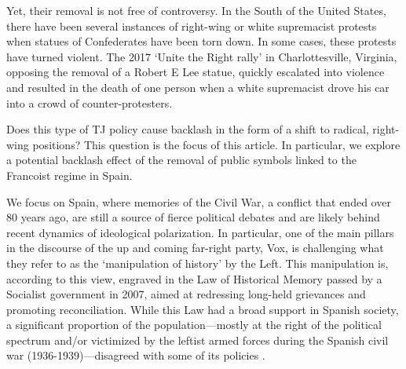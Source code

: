 \documentclass[12pt, notitlepage]{article}
\begin{document}
Yet, their removal is not free of controversy.
In the South of the United States, there have been several instances of right-wing or white supremacist protests when statues of Confederates have been torn down.
In some cases, these protests have turned violent.
The 2017 `Unite the Right rally' in Charlottesville, Virginia, opposing the removal of a Robert E Lee statue, quickly escalated into violence and resulted in the death of one person when a white supremacist drove his car into a crowd of counter-protesters.

Does this type of TJ policy cause backlash in the form of a shift to radical, right-wing positions?
This question is the focus of this article.
In particular, we explore a potential backlash effect of the removal of public symbols linked to the Francoist regime in Spain.



We focus on Spain, where memories of the Civil War, a conflict that ended over 80 years ago, are still a source of fierce political debates and are likely behind recent dynamics of ideological polarization.
In particular, one of the main pillars in the discourse of the up and coming far-right party, Vox, is challenging what they refer to as the `manipulation of history' by the Left.
This manipulation is, according to this view, engraved in the Law of Historical Memory passed by a Socialist government in 2007, aimed at redressing long-held grievances and promoting reconciliation.
While this Law had a broad support in Spanish society, a significant proportion of the population---mostly at the right of the political spectrum and/or victimized by the leftist armed forces during the Spanish civil war (1936-1939)---disagreed with some of its policies \cite{Aguilar:2011aa}.%
\end{document}
